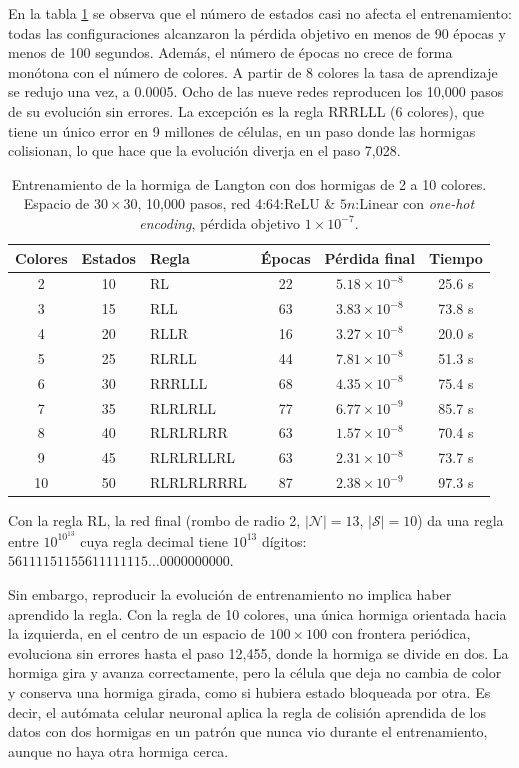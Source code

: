 En la tabla \ref{tab:langton_colores} se observa que el número de estados casi no afecta el entrenamiento: todas las configuraciones alcanzaron la pérdida objetivo en menos de 90 épocas y menos de 100 segundos. Además, el número de épocas no crece de forma monótona con el número de colores. A partir de 8 colores la tasa de aprendizaje se redujo una vez, a 0.0005. Ocho de las nueve redes reproducen los 10,000 pasos de su evolución sin errores. La excepción es la regla RRRLLL (6 colores), que tiene un único error en 9 millones de células, en un paso donde las hormigas colisionan, lo que hace que la evolución diverja en el paso 7,028.

\begin{table}[H]
	\centering
	\begin{tabular}{c c l c c c}
		\toprule
		Colores & Estados & Regla & Épocas & Pérdida final & Tiempo \\
		\midrule
		2  & 10 & RL         & 22 & $5.18 \times 10^{-8}$ & 25.6 s \\
		3  & 15 & RLL        & 63 & $3.83 \times 10^{-8}$ & 73.8 s \\
		4  & 20 & RLLR       & 16 & $3.27 \times 10^{-8}$ & 20.0 s \\
		5  & 25 & RLRLL      & 44 & $7.81 \times 10^{-8}$ & 51.3 s \\
		6  & 30 & RRRLLL     & 68 & $4.35 \times 10^{-8}$ & 75.4 s \\
		7  & 35 & RLRLRLL    & 77 & $6.77 \times 10^{-9}$ & 85.7 s \\
		8  & 40 & RLRLRLRR   & 63 & $1.57 \times 10^{-8}$ & 70.4 s \\
		9  & 45 & RLRLRLLRL  & 63 & $2.31 \times 10^{-8}$ & 73.7 s \\
		10 & 50 & RLRLRLRRRL & 87 & $2.38 \times 10^{-9}$ & 97.3 s \\
		\bottomrule
	\end{tabular}
	\caption{Entrenamiento de la hormiga de Langton con dos hormigas de 2 a 10 colores. Espacio de $30 \times 30$, 10,000 pasos, red 4:64:ReLU \& $5n$:Linear con \textit{one-hot encoding}, pérdida objetivo $1 \times 10^{-7}$.}
	\label{tab:langton_colores}
\end{table}

Con la regla RL, la red final (rombo de radio 2, $|\mathcal{N}| = 13$, $|\mathcal{S}| = 10$) da una regla entre $10^{10^{13}}$ cuya regla decimal tiene $10^{13}$ dígitos: $56111151155611111115\ldots0000000000$.

Sin embargo, reproducir la evolución de entrenamiento no implica haber aprendido la regla. Con la regla de 10 colores, una única hormiga orientada hacia la izquierda, en el centro de un espacio de $100 \times 100$ con frontera periódica, evoluciona sin errores hasta el paso 12,455, donde la hormiga se divide en dos. La hormiga gira y avanza correctamente, pero la célula que deja no cambia de color y conserva una hormiga girada, como si hubiera estado bloqueada por otra. Es decir, el autómata celular neuronal aplica la regla de colisión aprendida de los datos con dos hormigas en un patrón que nunca vio durante el entrenamiento, aunque no haya otra hormiga cerca.

